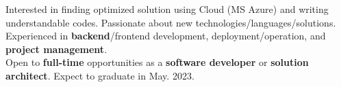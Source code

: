 

\begin{cvparagraph}

  Interested in finding optimized solution using Cloud (MS Azure) and writing understandable codes. Passionate about new technologies/languages/solutions. Experienced in \textbf{backend}/frontend development, deployment/operation, and \textbf{project management}. \\
  Open to \textbf{full-time} opportunities as a \textbf{software developer} or \textbf{solution architect}. Expect to graduate in May. 2023.
\end{cvparagraph}
